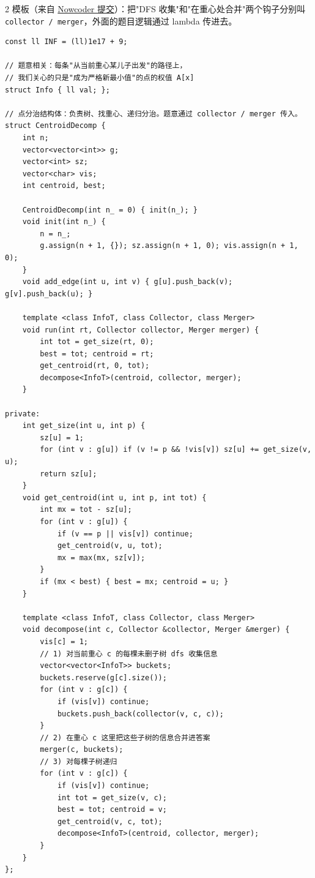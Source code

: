 \begin{multicols*}{2}
		模板（来自 \href{https://ac.nowcoder.com/acm/contest/view-submission?submissionId=80398271}{Nowcoder 提交}）：把"DFS 收集"和"在重心处合并"两个钩子分别叫 \texttt{collector / merger}，外面的题目逻辑通过 lambda 传进去。

		\begin{verbatim}
const ll INF = (ll)1e17 + 9;

// 题意相关：每条"从当前重心某儿子出发"的路径上，
// 我们关心的只是"成为严格新最小值"的点的权值 A[x]
struct Info { ll val; };

// 点分治结构体：负责树、找重心、递归分治。题意通过 collector / merger 传入。
struct CentroidDecomp {
    int n;
    vector<vector<int>> g;
    vector<int> sz;
    vector<char> vis;
    int centroid, best;

    CentroidDecomp(int n_ = 0) { init(n_); }
    void init(int n_) {
        n = n_;
        g.assign(n + 1, {}); sz.assign(n + 1, 0); vis.assign(n + 1, 0);
    }
    void add_edge(int u, int v) { g[u].push_back(v); g[v].push_back(u); }

    template <class InfoT, class Collector, class Merger>
    void run(int rt, Collector collector, Merger merger) {
        int tot = get_size(rt, 0);
        best = tot; centroid = rt;
        get_centroid(rt, 0, tot);
        decompose<InfoT>(centroid, collector, merger);
    }

private:
    int get_size(int u, int p) {
        sz[u] = 1;
        for (int v : g[u]) if (v != p && !vis[v]) sz[u] += get_size(v, u);
        return sz[u];
    }
    void get_centroid(int u, int p, int tot) {
        int mx = tot - sz[u];
        for (int v : g[u]) {
            if (v == p || vis[v]) continue;
            get_centroid(v, u, tot);
            mx = max(mx, sz[v]);
        }
        if (mx < best) { best = mx; centroid = u; }
    }

    template <class InfoT, class Collector, class Merger>
    void decompose(int c, Collector &collector, Merger &merger) {
        vis[c] = 1;
        // 1) 对当前重心 c 的每棵未删子树 dfs 收集信息
        vector<vector<InfoT>> buckets;
        buckets.reserve(g[c].size());
        for (int v : g[c]) {
            if (vis[v]) continue;
            buckets.push_back(collector(v, c, c));
        }
        // 2) 在重心 c 这里把这些子树的信息合并进答案
        merger(c, buckets);
        // 3) 对每棵子树递归
        for (int v : g[c]) {
            if (vis[v]) continue;
            int tot = get_size(v, c);
            best = tot; centroid = v;
            get_centroid(v, c, tot);
            decompose<InfoT>(centroid, collector, merger);
        }
    }
};


\end{verbatim}
\end{multicols*}
